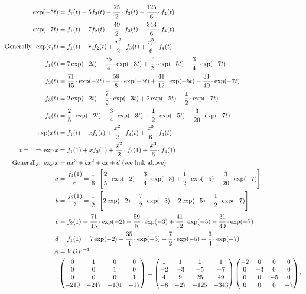 \documentclass[12pt,a4paper]{article}
\begin{document}
\begin{align}
\exp (-5t) &= f_1(t) - 5 f_2(t) + \cfrac{25}{2}\cdot f_3(t) - \cfrac{125}{6}\cdot f_4(t) \\
\exp (-7t) &= f_1(t) - 7 f_2(t) + \cfrac{49}{2}\cdot f_3(t) - \cfrac{343}{6}\cdot f_4(t) \\
\text{Generally, } \exp (r_i t) &= f_1(t) + r_i f_2(t) + \cfrac{r_i^2}{2} \cdot f_3(t) + \cfrac{r_i^3}{6} \cdot f_4(t) \\
f_1(t) &= 7 \exp(-2t) - \cfrac{35}{4}\cdot \exp(-3t) + \cfrac{7}{2}\cdot \exp(-5t) - \cfrac{3}{4}\cdot \exp(-7t) \\
f_2(t) &= \cfrac{71}{15}\cdot \exp(-2t) - \cfrac{59}{8}\cdot \exp(-3t) + \cfrac{41}{12}\cdot \exp(-5t) - \cfrac{31}{40}\cdot \exp(-7t) \\
f_3(t) &= 2 \exp(-2t) - \cfrac{7}{2}\cdot \exp(-3t) + 2 \exp(-5t) - \cfrac{1}{2}\cdot \exp(-7t) \\
f_4(t) &= \cfrac{2}{5}\cdot \exp(-2t) - \cfrac{3}{4}\cdot \exp(-3t) + \cfrac{1}{2}\cdot \exp(-5t) - \cfrac{3}{20}\cdot \exp(-7t) \\
\exp (xt) &= f_1(t) + x f_2(t) + \cfrac{x^2}{2} \cdot f_3(t) + \cfrac{x^3}{6} \cdot f_4(t) \\
t = 1 \Rightarrow \exp x &= f_1(1) + x f_2(1) + \cfrac{x^2}{2} \cdot f_3(1) + \cfrac{x^3}{6} \cdot f_4(1) \\
\text{Generally, } \exp x &= ax^3 + bx^2 + cx + d \text{ (see link above)} \\
a &= \cfrac{f_4(1)}{6} = \cfrac{1}{6}\cdot \left[ \cfrac{2}{5}\cdot \exp(-2) - \cfrac{3}{4}\cdot \exp(-3) + \cfrac{1}{2}\cdot \exp(-5) - \cfrac{3}{20}\cdot \exp(-7) \right] \\
b &= \cfrac{f_3(1)}{2} = \cfrac{1}{2}\cdot \left[ 2 \exp(-2) - \cfrac{7}{2}\cdot \exp(-3) + 2 \exp(-5) - \cfrac{1}{2}\cdot \exp(-7) \right] \\
c &= f_2(1) = \cfrac{71}{15}\cdot \exp(-2) - \cfrac{59}{8}\cdot \exp(-3) + \cfrac{41}{12}\cdot \exp(-5) - \cfrac{31}{40}\cdot \exp(-7) \\
d &= f_1(1) = 7 \exp(-2) - \cfrac{35}{4}\cdot \exp(-3) + \cfrac{7}{2}\cdot \exp(-5) - \cfrac{3}{4}\cdot \exp(-7) \\
A &= VDV^{-1} \\
&\left( \begin{matrix} 0 & 1 & 0 & 0 \\ 0 & 0 & 1 & 0  \\ 0 & 0 & 0 & 1 \\ -210 & -247 & -101 & -17 \end{matrix} \right) =
\left( \begin{matrix}  1 & 1 & 1 & 1 \\ -2 & -3 & -5 & -7 \\ 4 & 9 & 25 & 49 \\ -8 & -27 & -125 & -343 \end{matrix} \right)
\left( \begin{matrix} -2 & 0 & 0 & 0 \\  0 & -3 & 0 & 0 \\ 0 & 0 & -5 & 0 \\ 0 & 0 & 0 & -7  \end{matrix} \right) \cdot \nonumber
\end{align}
\end{document}
